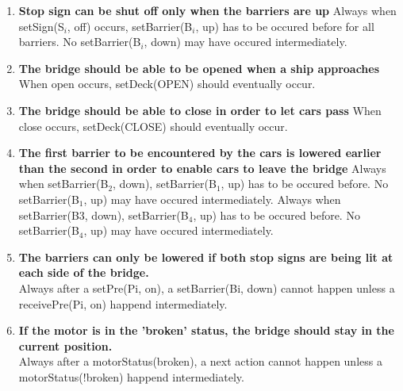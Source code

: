 \begin{enumerate}
	\item \textbf{Stop sign can be shut off only when the barriers are up}
	Always when setSign(S$_i$, off) occurs, setBarrier(B$_i$, up) has to be occured before for all barriers. No setBarrier(B$_i$, down) may have occured intermediately.

	\item \textbf{The bridge should be able to be opened when a ship approaches}
	When open occurs, setDeck(OPEN) should eventually occur.

	\item \textbf{The bridge should be able to close in order to let cars pass}
	When close occurs, setDeck(CLOSE) should eventually occur.

	\item \textbf{The first barrier to be encountered by the cars is lowered earlier than the second in order to enable cars to leave the bridge}
	Always when setBarrier(B$_2$, down), setBarrier(B$_1$, up) has to be occured before. No setBarrier(B$_1$, up) may have occured intermediately.
	Always when setBarrier(B3, down), setBarrier(B$_4$, up) has to be occured before. No setBarrier(B$_4$, up) may have occured intermediately.
	
	\item \textbf{The barriers can only be lowered if both stop signs are being lit at each side of the bridge.} \\
	Always after a setPre(Pi, on), a setBarrier(Bi, down) cannot happen unless a receivePre(Pi, on) happend intermediately.

	\item \textbf{If the motor is in the 'broken' status, the bridge should stay in the current position.} \\
	Always after a motorStatus(broken), a next action cannot happen unless a motorStatus(!broken) happend intermediately.

\end{enumerate}
